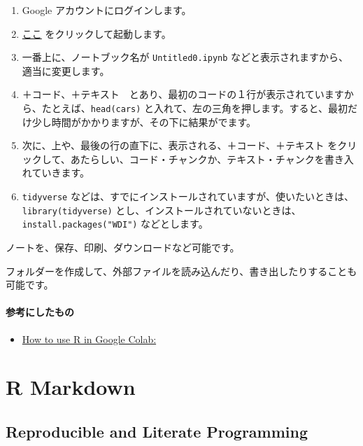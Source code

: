 \documentclass[
]{bxjsbook}
\providecommand{\tightlist}{%
  \setlength{\itemsep}{0pt}\setlength{\parskip}{0pt}}
\theoremstyle{definition}
\theoremstyle{definition}
\theoremstyle{definition}
\theoremstyle{definition}
\theoremstyle{remark}
\begin{document}
\begin{enumerate}
\def\labelenumi{\arabic{enumi}.}
\tightlist
\item
  Google アカウントにログインします。
\item
  \href{https://colab.research.google.com/\#create=true\&language=r}{ここ} をクリックして起動します。
\item
  一番上に、ノートブック名が \texttt{Untitled0.ipynb} などと表示されますから、適当に変更します。
\item
  ＋コード、＋テキスト　とあり、最初のコードの１行が表示されていますから、たとえば、\texttt{head(cars)} と入れて、左の三角を押します。すると、最初だけ少し時間がかかりますが、その下に結果がでます。
\item
  次に、上や、最後の行の直下に、表示される、＋コード、＋テキスト をクリックして、あたらしい、コード・チャンクか、テキスト・チャンクを書き入れていきます。
\item
  \texttt{tidyverse} などは、すでにインストールされていますが、使いたいときは、\texttt{library(tidyverse)} とし、インストールされていないときは、\texttt{install.packages("WDI")} などとします。
\end{enumerate}

ノートを、保存、印刷、ダウンロードなど可能です。

フォルダーを作成して、外部ファイルを読み込んだり、書き出したりすることも可能です。

\hypertarget{ux53c2ux8003ux306bux3057ux305fux3082ux306e}{%
\paragraph{参考にしたもの}\label{ux53c2ux8003ux306bux3057ux305fux3082ux306e}}

\begin{itemize}
\tightlist
\item
  \href{https://towardsdatascience.com/how-to-use-r-in-google-colab-b6e02d736497}{How to use R in Google Colab:}
\end{itemize}

\hypertarget{rmarkdown}{%
\section{R Markdown}\label{rmarkdown}}

\hypertarget{reproducible-and-literate-programming}{%
\subsection{Reproducible and Literate Programming}\label{reproducible-and-literate-programming}}
\end{document}
